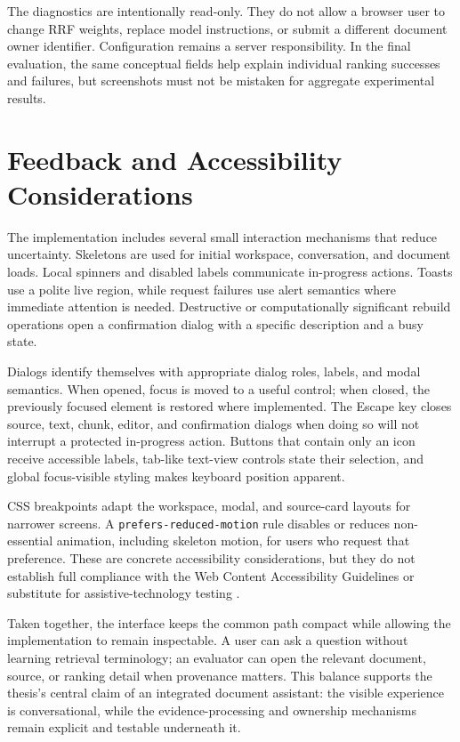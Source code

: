 The diagnostics are intentionally read-only. They do not allow a browser user to change RRF weights, replace model instructions, or submit a different document owner identifier. Configuration remains a server responsibility. In the final evaluation, the same conceptual fields help explain individual ranking successes and failures, but screenshots must not be mistaken for aggregate experimental results.

\section{Feedback and Accessibility Considerations}
\label{sec:feedback-accessibility}

The implementation includes several small interaction mechanisms that reduce uncertainty. Skeletons are used for initial workspace, conversation, and document loads. Local spinners and disabled labels communicate in-progress actions. Toasts use a polite live region, while request failures use alert semantics where immediate attention is needed. Destructive or computationally significant rebuild operations open a confirmation dialog with a specific description and a busy state.

Dialogs identify themselves with appropriate dialog roles, labels, and modal semantics. When opened, focus is moved to a useful control; when closed, the previously focused element is restored where implemented. The Escape key closes source, text, chunk, editor, and confirmation dialogs when doing so will not interrupt a protected in-progress action. Buttons that contain only an icon receive accessible labels, tab-like text-view controls state their selection, and global focus-visible styling makes keyboard position apparent.

CSS breakpoints adapt the workspace, modal, and source-card layouts for narrower screens. A \texttt{prefers-reduced-motion} rule disables or reduces non-essential animation, including skeleton motion, for users who request that preference. These are concrete accessibility considerations, but they do not establish full compliance with the Web Content Accessibility Guidelines or substitute for assistive-technology testing \cite{WCAG22}.

Taken together, the interface keeps the common path compact while allowing the implementation to remain inspectable. A user can ask a question without learning retrieval terminology; an evaluator can open the relevant document, source, or ranking detail when provenance matters. This balance supports the thesis's central claim of an integrated document assistant: the visible experience is conversational, while the evidence-processing and ownership mechanisms remain explicit and testable underneath it.
